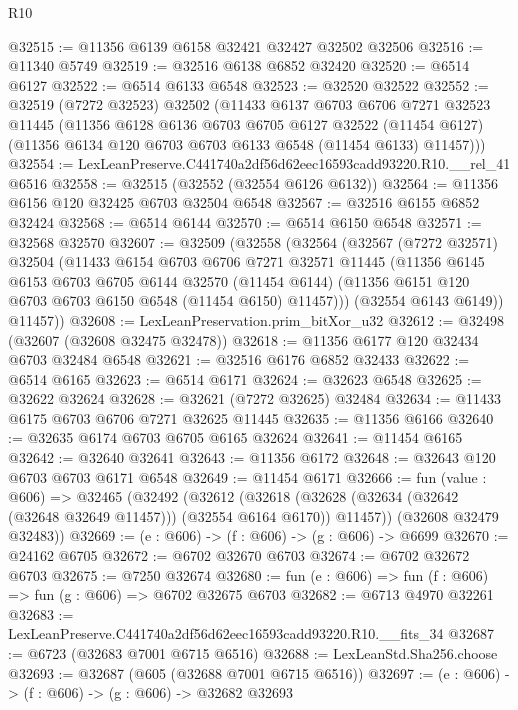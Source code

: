 \begin{lexlean}{R10}
\begin{coremodule}
@32515 := @11356 @6139 @6158 @32421 @32427 @32502 @32506
@32516 := @11340 @5749
@32519 := @32516 @6138 @6852 @32420
@32520 := @6514 @6127
@32522 := @6514 @6133 @6548
@32523 := @32520 @32522
@32552 := @32519
    (@7272 @32523)
    @32502
    (@11433
      @6137
      @6703
      @6706
      @7271
      @32523
      @11445
      (@11356
        @6128
        @6136
        @6703
        @6705
        @6127
        @32522
        (@11454 @6127)
        (@11356 @6134 @120 @6703 @6703 @6133 @6548 (@11454 @6133) @11457)))
@32554 := LexLeanPreserve.C441740a2df56d62eec16593cadd93220.R10.__rel_41 @6516
@32558 := @32515 (@32552 (@32554 @6126 @6132))
@32564 := @11356 @6156 @120 @32425 @6703 @32504 @6548
@32567 := @32516 @6155 @6852 @32424
@32568 := @6514 @6144
@32570 := @6514 @6150 @6548
@32571 := @32568 @32570
@32607 := @32509
    (@32558
      (@32564
        (@32567
          (@7272 @32571)
          @32504
          (@11433
            @6154
            @6703
            @6706
            @7271
            @32571
            @11445
            (@11356
              @6145
              @6153
              @6703
              @6705
              @6144
              @32570
              (@11454 @6144)
              (@11356 @6151 @120 @6703 @6703 @6150 @6548 (@11454 @6150) @11457)))
          (@32554 @6143 @6149))
        @11457))
@32608 := LexLeanPreservation.prim_bitXor_u32
@32612 := @32498 (@32607 (@32608 @32475 @32478))
@32618 := @11356 @6177 @120 @32434 @6703 @32484 @6548
@32621 := @32516 @6176 @6852 @32433
@32622 := @6514 @6165
@32623 := @6514 @6171
@32624 := @32623 @6548
@32625 := @32622 @32624
@32628 := @32621 (@7272 @32625) @32484
@32634 := @11433 @6175 @6703 @6706 @7271 @32625 @11445
@32635 := @11356 @6166
@32640 := @32635 @6174 @6703 @6705 @6165 @32624
@32641 := @11454 @6165
@32642 := @32640 @32641
@32643 := @11356 @6172
@32648 := @32643 @120 @6703 @6703 @6171 @6548
@32649 := @11454 @6171
@32666 := fun (value : @606) =>
  @32465
    (@32492
      (@32612
        (@32618 (@32628 (@32634 (@32642 (@32648 @32649 @11457))) (@32554 @6164 @6170)) @11457))
      (@32608 @32479 @32483))
@32669 := (e : @606) -> (f : @606) -> (g : @606) -> @6699
@32670 := @24162 @6705
@32672 := @6702 @32670 @6703
@32674 := @6702 @32672 @6703
@32675 := @7250 @32674
@32680 := fun (e : @606) => fun (f : @606) => fun (g : @606) => @6702 @32675 @6703
@32682 := @6713 @4970 @32261
@32683 := LexLeanPreserve.C441740a2df56d62eec16593cadd93220.R10.__fits_34
@32687 := @6723 (@32683 @7001 @6715 @6516)
@32688 := LexLeanStd.Sha256.choose
@32693 := @32687 (@605 (@32688 @7001 @6715 @6516))
@32697 := (e : @606) -> (f : @606) -> (g : @606) -> @32682 @32693

\end{coremodule}
\end{lexlean}

